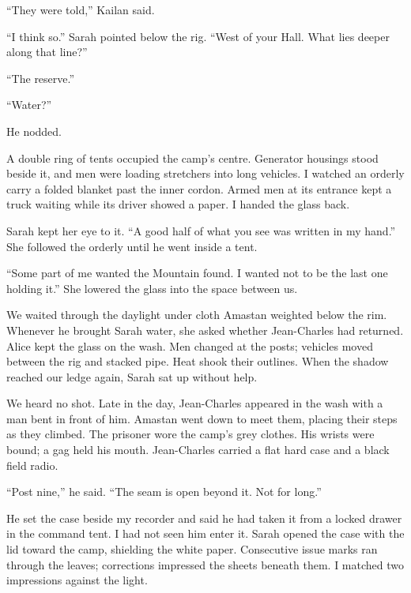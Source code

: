 ``They were told,'' Kailan said.\par

``I think so.'' Sarah pointed below the rig. ``West of your Hall. What lies deeper along that line?''\par

``The reserve.''\par

``Water?''\par

He nodded.\par

A double ring of tents occupied the camp's centre. Generator housings stood beside it, and men were loading stretchers into long vehicles. I watched an orderly carry a folded blanket past the inner cordon. Armed men at its entrance kept a truck waiting while its driver showed a paper. I handed the glass back.\par

Sarah kept her eye to it. ``A good half of what you see was written in my hand.'' She followed the orderly until he went inside a tent.\par

``Some part of me wanted the Mountain found. I wanted not to be the last one holding it.'' She lowered the glass into the space between us.\par

We waited through the daylight under cloth Amastan weighted below the rim. Whenever he brought Sarah water, she asked whether Jean-Charles had returned. Alice kept the glass on the wash. Men changed at the posts; vehicles moved between the rig and stacked pipe. Heat shook their outlines. When the shadow reached our ledge again, Sarah sat up without help.\par

We heard no shot. Late in the day, Jean-Charles appeared in the wash with a man bent in front of him. Amastan went down to meet them, placing their steps as they climbed. The prisoner wore the camp's grey clothes. His wrists were bound; a gag held his mouth. Jean-Charles carried a flat hard case and a black field radio.\par

``Post nine,'' he said. ``The seam is open beyond it. Not for long.''\par

He set the case beside my recorder and said he had taken it from a locked drawer in the command tent. I had not seen him enter it. Sarah opened the case with the lid toward the camp, shielding the white paper. Consecutive issue marks ran through the leaves; corrections impressed the sheets beneath them. I matched two impressions against the light.\par


